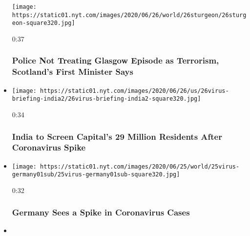 \begin{itemize}
  \texttt{[image: https://static01.nyt.com/images/2020/06/26/world/26sturgeon/26sturgeon-square320.jpg]}

  0:37

  \hypertarget{police-not-treating-glasgow-episode-as-terrorism-scotlands-first-minister-says}{%
  \subsubsection{Police Not Treating Glasgow Episode as Terrorism,
  Scotland's First Minister
  Says}\label{police-not-treating-glasgow-episode-as-terrorism-scotlands-first-minister-says}}
\item
  \href{https://www.nytimes.com/video/us/100000007212150/new-delhi-coronavirus-tests.html?action=click\&module=video-series-bar\&region=header\&pgtype=Article\&playlistId=video/world}{}

  \texttt{[image: https://static01.nyt.com/images/2020/06/26/us/26virus-briefing-india2/26virus-briefing-india2-square320.jpg]}

  0:34

  \hypertarget{india-to-screen-capitals-29-million-residents-after-coronavirus-spike}{%
  \subsubsection{India to Screen Capital's 29 Million Residents After
  Coronavirus
  Spike}\label{india-to-screen-capitals-29-million-residents-after-coronavirus-spike}}
\item
  \href{https://www.nytimes.com/video/us/100000007210500/germany-spike-coronavirus-cases.html?action=click\&module=video-series-bar\&region=header\&pgtype=Article\&playlistId=video/world}{}

  \texttt{[image: https://static01.nyt.com/images/2020/06/25/world/25virus-germany01sub/25virus-germany01sub-square320.jpg]}

  0:32

  \hypertarget{germany-sees-a-spike-in-coronavirus-cases}{%
  \subsubsection{Germany Sees a Spike in Coronavirus
  Cases}\label{germany-sees-a-spike-in-coronavirus-cases}}
\item
  \href{https://www.nytimes.com/video/us/100000007208621/trump-hosts-polish-president.html?action=click\&module=video-series-bar\&region=header\&pgtype=Article\&playlistId=video/world}{}


\end{itemize}

